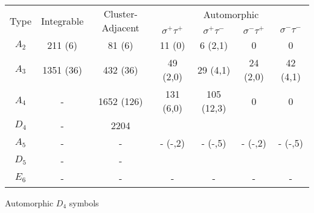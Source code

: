 \documentclass[12pt]{article}
\begin{document}
\begin{center}
\begin{tabular}{ | c | c | c | c | c | c |  c |}
\multicolumn{1}{c}{\multirow{2}{*}{Type}} & \multicolumn{1}{c}{\multirow{2}{*}{Integrable}} & \multicolumn{1}{c}{\multirow{2}{*}{Cluster-Adjacent}} & \multicolumn{4}{c}{Automorphic} \\
\multicolumn{1}{c}{} & \multicolumn{1}{c}{} & \multicolumn{1}{c}{} & \multicolumn{1}{c}{$\sigma^+ \tau^+$} & \multicolumn{1}{c}{$\sigma^+ \tau^-$} & \multicolumn{1}{c}{$\sigma^- \tau^+$} & \multicolumn{1}{c}{$\sigma^- \tau^-$} \\
\hline \(A_2\) & 211 (6) & 81 (6) & 11 (0) & 6 (2,1) & 0 & 0 \\ 
\hline \(A_3\) & 1351 (36) & 432 (36) & 49 (2,0) & 29 (4,1) & 24 (2,0) & 42 (4,1) \\ 
\hline \(A_4\) & - & 1652 (126) & 131 (6,0) & 105 (12,3) & 0 & 0 \\ 
\hline \(D_4\) & - & 2204  \\ 
\hline \(A_5\) & - & - & - (-,2) & - (-,5) & - (-,2) & - (-,5) \\ 
\hline \(D_5\) & - & -  \\ 
\hline \(E_6\) & - & - & - & - & - & -  \\ 
\hline
\end{tabular} 
\vspace{.6cm}

Automorphic $D_4$ symbols


\end{center}
\end{document}
